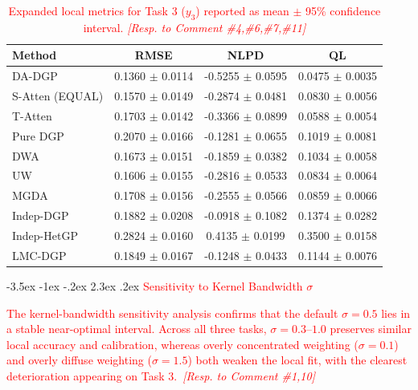 \documentclass[11pt]{article}
\makeatletter
\renewcommand\section{\@startsection {section}{1}{\z@}%
	{-3.5ex \@plus -1ex \@minus -.2ex}%
	{2.3ex \@plus.2ex}%
	{\normalfont\fontfamily{phv}\fontsize{16}{19}\bfseries}}
\newcommand{\revSUPP}[2]{\textcolor{red}{#1\ \textit{[Resp. to Comment \##2]}}}
\makeatother
\begin{document}
	\begin{table}[htbp]
		\centering
		\caption{\textcolor{red}{Expanded local metrics for Task 3 ($y_3$) reported as mean $\pm$ 95\% confidence interval. \textit{[Resp. to Comment \#4,\#6,\#7,\#11]}}}
		\label{tab:supp_task3_stats}
		{\color{red}\small
		\begin{tabular*}{\textwidth}{@{\extracolsep{\fill}}lccc}
			\toprule
			\textbf{Method} & \textbf{RMSE} & \textbf{NLPD} & \textbf{QL} \\
			\midrule
			DA-DGP & 0.1360 $\pm$ 0.0114 & -0.5255 $\pm$ 0.0595 & 0.0475 $\pm$ 0.0035 \\
			S-Atten (EQUAL) & 0.1570 $\pm$ 0.0149 & -0.2874 $\pm$ 0.0481 & 0.0830 $\pm$ 0.0056 \\
			T-Atten & 0.1703 $\pm$ 0.0142 & -0.3366 $\pm$ 0.0899 & 0.0588 $\pm$ 0.0054 \\
			Pure DGP & 0.2070 $\pm$ 0.0166 & -0.1281 $\pm$ 0.0655 & 0.1019 $\pm$ 0.0081 \\
			DWA & 0.1673 $\pm$ 0.0151 & -0.1859 $\pm$ 0.0382 & 0.1034 $\pm$ 0.0058 \\
			UW & 0.1606 $\pm$ 0.0155 & -0.2816 $\pm$ 0.0533 & 0.0834 $\pm$ 0.0064 \\
			MGDA & 0.1708 $\pm$ 0.0156 & -0.2555 $\pm$ 0.0566 & 0.0859 $\pm$ 0.0066 \\
			Indep-DGP & 0.1882 $\pm$ 0.0208 & -0.0918 $\pm$ 0.1082 & 0.1374 $\pm$ 0.0282 \\
			Indep-HetGP & 0.2824 $\pm$ 0.0160 & 0.4135 $\pm$ 0.0199 & 0.3500 $\pm$ 0.0158 \\
			LMC-DGP & 0.1849 $\pm$ 0.0167 & -0.1248 $\pm$ 0.0433 & 0.1144 $\pm$ 0.0076 \\
			\bottomrule
		\end{tabular*}
		}
	\end{table}
	
	\clearpage
	\section{\textcolor{red}{Sensitivity to Kernel Bandwidth $\sigma$}} \label{app:F}
	\setcounter{equation}{0}
	\setcounter{figure}{0}
	\setcounter{table}{0}
	
	\revSUPP{The kernel-bandwidth sensitivity analysis confirms that the default $\sigma=0.5$ lies in a stable near-optimal interval. Across all three tasks, $\sigma=0.3$--$1.0$ preserves similar local accuracy and calibration, whereas overly concentrated weighting ($\sigma=0.1$) and overly diffuse weighting ($\sigma=1.5$) both weaken the local fit, with the clearest deterioration appearing on Task 3.}{1,10}
	
\end{document}
